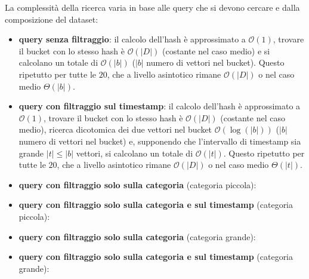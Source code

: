 La complessità della ricerca varia in base alle query che si devono cercare e dalla 
composizione del dataset:
\begin{itemize}
    \item \textbf{query senza filtraggio}: il calcolo dell'hash è approssimato a $\mathcal{O}(1)$,
    trovare il bucket con lo stesso hash è $\mathcal{O}(|D|)$ (costante nel caso medio) e 
    si calcolano un totale di $\mathcal{O}(|b|)$ ($|b|$ numero di vettori nel bucket). 
    Questo ripetutto per tutte le $20$, che a livello asintotico rimane $\mathcal{O}(|D|)$
    o nel caso medio $\Theta(|b|)$.
    \item \textbf{query con filtraggio sul timestamp}: il calcolo dell'hash è approssimato a $\mathcal{O}(1)$,
    trovare il bucket con lo stesso hash è $\mathcal{O}(|D|)$ (costante nel caso medio),
    ricerca dicotomica dei due vettori nel bucket $\mathcal{O}(\log(|b|))$ ($|b|$ numero di vettori nel bucket) 
    e, supponendo che l'intervallo di timestamp sia grande $|t|\le |b|$ vettori, 
    si calcolano un totale di $\mathcal{O}(|t|)$. 
    Questo ripetutto per tutte le $20$, che a livello asintotico rimane $\mathcal{O}(|D|)$
    o nel caso medio $\Theta(|t|)$.
    \item \textbf{query con filtraggio solo sulla categoria} (categoria piccola): 
    \item \textbf{query con filtraggio solo sulla categoria e sul timestamp} (categoria piccola): 
    \item \textbf{query con filtraggio solo sulla categoria} (categoria grande): 
    \item \textbf{query con filtraggio solo sulla categoria e sul timestamp} (categoria grande): 
    
    

\end{itemize}